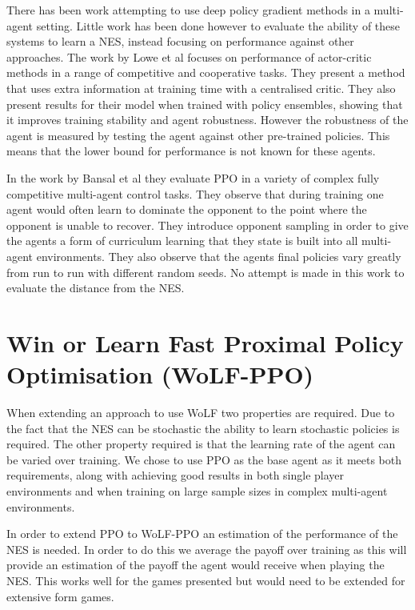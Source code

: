 \documentclass[conference]{IEEEtran}
\begin{document}
There has been work attempting to use deep policy gradient methods in a multi-agent setting. Little work has been done however to evaluate the ability of these systems to learn a NES, instead focusing on performance against other approaches. The work by Lowe et al\cite{lowe2017multi} focuses on performance of actor-critic methods in a range of competitive and cooperative tasks. They present a method that uses extra information at training time with a centralised critic. They also present results for their model when trained with policy ensembles, showing that it improves training stability and agent robustness. However the robustness of the agent is measured by testing the agent against other pre-trained policies. This means that the lower bound for performance is not known for these agents.

In the work by Bansal et al\cite{bansal2017emergent} they evaluate PPO in a variety of complex fully competitive multi-agent control tasks. They observe that during training one agent would often learn to dominate the opponent to the point where the opponent is unable to recover. They introduce opponent sampling in order to give the agents a form of curriculum learning that they state is built into all multi-agent environments. They also observe that the agents final policies vary greatly from run to run with different random seeds. No attempt is made in this work to evaluate the distance from the NES.

\section{Win or Learn Fast Proximal Policy Optimisation (WoLF-PPO)}

When extending an approach to use WoLF two properties are required. Due to the fact that the NES can be stochastic the ability to learn stochastic policies is required. The other property required is that the learning rate of the agent can be varied over training. We chose to use PPO as the base agent as it meets both requirements, along with achieving good results in both single player environments and when training on large sample sizes in complex multi-agent environments\cite{OpenAI_dota}.

In order to extend PPO to WoLF-PPO an estimation of the performance of the NES is needed. In order to do this we average the payoff over training as this will provide an estimation of the payoff the agent would receive when playing the NES. This works well for the games presented but would need to be extended for extensive form games.
\end{document}
